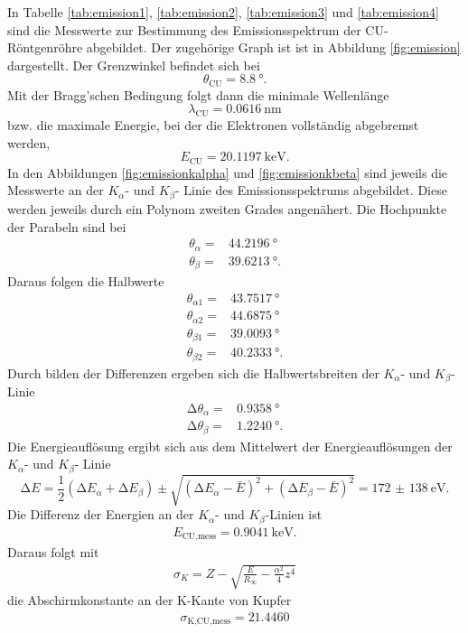 In Tabelle \ref{tab:emission1}, \ref{tab:emission2}, \ref{tab:emission3} und
\ref{tab:emission4} sind die Messwerte zur Bestimmung des
Emissionsspektrum der CU-Röntgenröhre abgebildet. Der zugehörige Graph ist
ist in Abbildung \ref{fig:emission} dargestellt.
Der Grenzwinkel befindet sich bei
\begin{equation}
  \theta_\text{CU} = \SI{8.8}{\degree}.
\end{equation}
Mit der Bragg'schen Bedingung folgt dann die minimale Wellenlänge
\begin{equation}
  \lambda_\text{CU} = \SI{0.0616}{\nano\meter}
\end{equation}
bzw. die maximale Energie, bei der die Elektronen vollständig abgebremst werden,
\begin{equation}
  E_\text{CU} = \SI{20.1197}{\kilo\electronvolt}.
\end{equation}
In den Abbildungen \ref{fig:emissionkalpha} und \ref{fig:emissionkbeta} sind
jeweils die Messwerte an der $K_\alpha$- und $K_\beta$- Linie des
Emissionsspektrums abgebildet. Diese werden jeweils durch ein Polynom zweiten
Grades angenähert.
Die Hochpunkte der Parabeln sind bei
\begin{align}
  \theta_\alpha = & \SI{44.2196}{\degree} \\
  \theta_\beta = & \SI{39.6213}{\degree}.
\end{align}
Daraus folgen die Halbwerte
\begin{align}
  \theta_{\alpha 1} = & \SI{43.7517}{\degree} \\
  \theta_{\alpha 2} = & \SI{44.6875}{\degree} \\
  \theta_{\beta 1} = & \SI{39.0093}{\degree} \\
  \theta_{\beta 2} = & \SI{40.2333}{\degree}.
\end{align}
Durch bilden der Differenzen ergeben sich die Halbwertsbreiten der
$K_\alpha$- und $K_\beta$- Linie
\begin{align}
  \increment \theta_\alpha = & \SI{0.9358}{\degree} \\
  \increment \theta_\beta = & \SI{1.2240}{\degree}.
\end{align}
Die Energieauflösung ergibt sich aus dem Mittelwert der Energieauflösungen
der $K_\alpha$- und $K_\beta$- Linie
\begin{equation}
  \increment E = \frac{1}{2}(\increment E_\alpha + \increment E_\beta) \pm
  \sqrt{(\increment E_\alpha - \bar{E})^2 + (\increment E_\beta - \bar{E})^2}
  = \SI{172(138)}{\electronvolt}.
\end{equation}
Die Differenz der Energien an der $K_\alpha$- und $K_\beta$-Linien ist
\begin{align}
  E_\text{CU,mess} = \SI{0.9041}{\kilo\electronvolt}.
\end{align}
Daraus folgt mit
\begin{align}
  \sigma_K = Z - \sqrt{\frac{E}{R_\infty}- \frac{\alpha^2}{4}z^4}
  \label{eqn:sigmaK}
\end{align}
die Abschirmkonstante an der K-Kante von Kupfer
\begin{align}
  \sigma_\text{K,CU,mess} = 21.4460
\end{align}


